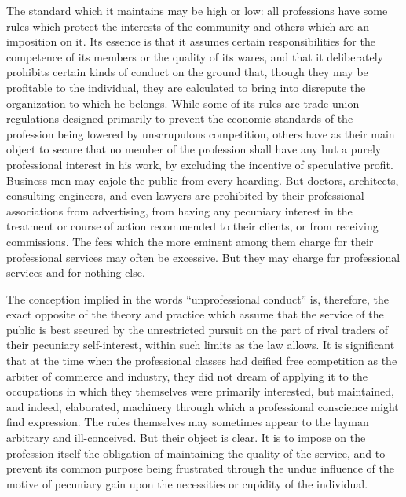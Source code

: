 \documentclass{book}
\begin{document}
The standard which it maintains may be high or low: all professions have some rules which protect the interests of the community and others which are an imposition on it. Its essence is that it assumes certain responsibilities for the competence of its members or the quality of its wares, and that it deliberately prohibits certain kinds of conduct on the ground that, though they may be profitable to the individual, they are calculated to bring into disrepute the organization to which he belongs. While some of its rules are trade union regulations designed primarily to prevent the economic standards of the profession being lowered by unscrupulous competition, others have as their main object to secure that no member of the profession shall have any but a purely professional interest in his work, by excluding the incentive of speculative profit. Business men may cajole the public from every hoarding. But doctors, architects, consulting engineers, and even lawyers are prohibited by their professional associations from advertising, from having any pecuniary interest in the treatment or course of action recommended to their clients, or from receiving commissions. The fees which the more eminent among them charge for their professional services may often be excessive. But they may charge for professional services and for nothing else.

The conception implied in the words “unprofessional conduct” is, therefore, the exact opposite of the theory and practice which assume that the service of the public is best secured by the unrestricted pursuit on the part of rival traders of their pecuniary self-interest, within such limits as the law allows. It is significant that at the time when the professional classes had deified free competition as the arbiter of commerce and industry, they did not dream of applying it to the occupations in which they themselves were primarily interested, but maintained, and indeed, elaborated, machinery through which a professional conscience might find expression. The rules themselves may sometimes appear to the layman arbitrary and ill-conceived. But their object is clear. It is to impose on the profession itself the obligation of maintaining the quality of the service, and to prevent its common purpose being frustrated through the undue influence of the motive of pecuniary gain upon the necessities or cupidity of the individual.
\end{document}
